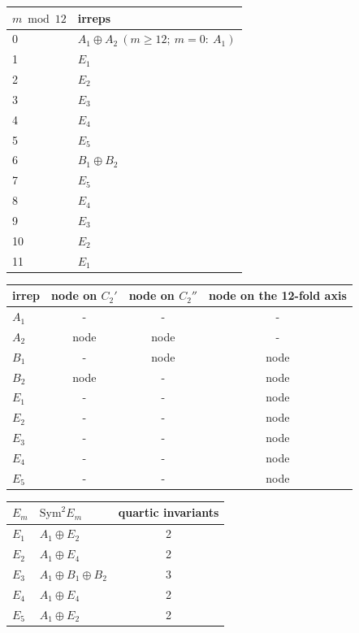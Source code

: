 \begin{tabular}{ll}
\hline
$m \bmod 12$ & irreps \\
\hline
0 & $A_1 \oplus A_2\ (m \ge 12;\ m = 0:\ A_1)$ \\
1 & $E_1$ \\
2 & $E_2$ \\
3 & $E_3$ \\
4 & $E_4$ \\
5 & $E_5$ \\
6 & $B_1 \oplus B_2$ \\
7 & $E_5$ \\
8 & $E_4$ \\
9 & $E_3$ \\
10 & $E_2$ \\
11 & $E_1$ \\
\hline
\end{tabular}

\begin{tabular}{lccc}
\hline
irrep & node on $C_2'$ & node on $C_2''$ & node on the 12-fold axis \\
\hline
$A_1$ & - & - & - \\
$A_2$ & node & node & - \\
$B_1$ & - & node & node \\
$B_2$ & node & - & node \\
$E_1$ & - & - & node \\
$E_2$ & - & - & node \\
$E_3$ & - & - & node \\
$E_4$ & - & - & node \\
$E_5$ & - & - & node \\
\hline
\end{tabular}

\begin{tabular}{llc}
\hline
$E_m$ & $\mathrm{Sym}^2 E_m$ & quartic invariants \\
\hline
$E_1$ & $A_1 \oplus E_2$ & 2 \\
$E_2$ & $A_1 \oplus E_4$ & 2 \\
$E_3$ & $A_1 \oplus B_1 \oplus B_2$ & 3 \\
$E_4$ & $A_1 \oplus E_4$ & 2 \\
$E_5$ & $A_1 \oplus E_2$ & 2 \\
\hline
\end{tabular}

